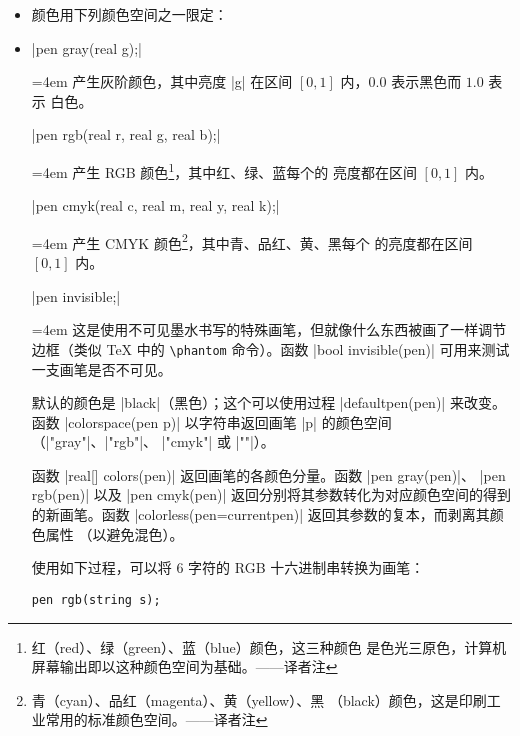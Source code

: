 \documentclass{ctexbook}
\newenvironment{funclist}{\trivlist
  \parindent=0pt
\item[]
  \def\item{\medskip\par\leftskip=0pt}
  \def\go{\par\leftskip=4em}}
{\endtrivlist}
\newcommand\transnote[1]{\footnote{#1——译者注}}
\begin{document}
\begin{itemize}
  \item 颜色用下列颜色空间之一限定：
\begin{funclist}
\item |pen gray(real g);| \go
  产生灰阶颜色，其中亮度 |g| 在区间 $[0,1]$ 内，$0.0$ 表示黑色而 $1.0$ 表示
  白色。

\item |pen rgb(real r, real g, real b);| \go
  产生 RGB 颜色\transnote{红（red）、绿（green）、蓝（blue）颜色，这三种颜色
  是色光三原色，计算机屏幕输出即以这种颜色空间为基础。}，其中红、绿、蓝每个的
  亮度都在区间 $[0,1]$ 内。

\item |pen cmyk(real c, real m, real y, real k);| \go
  产生 CMYK 颜色\transnote{青（cyan）、品红（magenta）、黄（yellow）、黑
  （black）颜色，这是印刷工业常用的标准颜色空间。}，其中青、品红、黄、黑每个
  的亮度都在区间 $[0,1]$ 内。

\item |pen invisible;| \go
  这是使用不可见墨水书写的特殊画笔，但就像什么东西被画了一样调节边框（类似
  \TeX{} 中的 \verb=\phantom= 命令）。函数 |bool invisible(pen)| 可用来测试
  一支画笔是否不可见。
\end{funclist}

默认的颜色是 |black|（黑色）；这个可以使用过程 |defaultpen(pen)| 来改变。函数
|colorspace(pen p)| 以字符串返回画笔 |p| 的颜色空间（|"gray"|、|"rgb"|、
|"cmyk"| 或 |""|）。

函数 |real[] colors(pen)| 返回画笔的各颜色分量。函数 |pen gray(pen)|、
|pen rgb(pen)| 以及 |pen cmyk(pen)| 返回分别将其参数转化为对应颜色空间的得到
的新画笔。函数 |colorless(pen=currentpen)| 返回其参数的复本，而剥离其颜色属性
（以避免混色）。

使用如下过程，可以将 6 字符的 RGB 十六进制串转换为画笔：
\begin{lstlisting}
pen rgb(string s);
\end{lstlisting}


\end{itemize}
\end{document}
